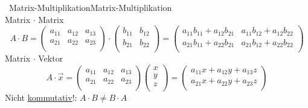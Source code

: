 		\begin{proposition}{\currentboxsection \ Matrix-Multiplikation}{Matrix-Multiplikation} \label{matrix-multiplikation}  \\
			Matrix $\cdot$ Matrix
			\begin{equation}
				A \cdot B =
				\begin{pmatrix}
					a_{11} & a_{12} & a_{13} \\
					a_{21} & a_{22} & a_{23} \\
				\end{pmatrix}
				\cdot
				\begin{pmatrix}
					b_{11} & b_{12} \\
					b_{21} & b_{22} \\
				\end{pmatrix}
				=
				\begin{pmatrix}
					a_{11}b_{11} + a_{12}b_{21} & a_{11}b_{12} + a_{12}b_{22} \\
					a_{21}b_{11} + a_{22}b_{21} & a_{21}b_{12} + a_{22}b_{22} \\
				\end{pmatrix}
			\end{equation}
			Matrix $\cdot$ Vektor			
			\begin{equation}
				A \cdot \vec{x} =
				\begin{pmatrix}
					a_{11} & a_{12} & a_{13} \\
					a_{21} & a_{22} & a_{23} \\
				\end{pmatrix}
				\begin{pmatrix}
					x \\
					y \\
					z \\
				\end{pmatrix}
				=
				\begin{pmatrix}
					a_{11}x + a_{12}y + a_{13}z \\
					a_{21}x + a_{22}y + a_{23}z \\
				\end{pmatrix}
			\end{equation}
			Nicht \hyperref[kommutativ]{kommutativ}!: $A \cdot B \neq B \cdot A$
		\end{proposition}
		
		
		
